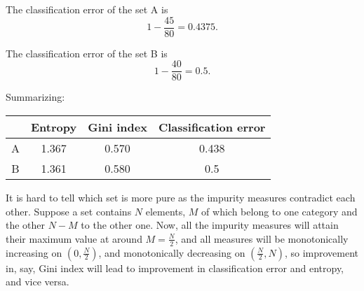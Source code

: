 \documentclass[10pt]{article}
\begin{document}
The classification error of the set A is
\[
1 - \frac{45}{80} = 0.4375.
\]

The classification error of the set B is
\[
1 - \frac{40}{80} = 0.5.
\]

Summarizing:
\begin{center}
\begin{tabular}{|c||c|c|c|}
\hline
  & Entropy & Gini index & Classification error \\
\hline
A & 1.367 & 0.570 & 0.438 \\
B & 1.361 & 0.580 & 0.5 \\
\hline
\end{tabular}
\end{center}
It is hard to tell which set is more pure as the impurity measures contradict each other. Suppose a set contains $N$ elements, $M$ of which belong to one category and the other $N - M$ to the other one. Now, all the impurity measures will attain their maximum value at around $M = \frac{N}{2}$, and all measures will be monotonically increasing on $(0, \frac{N}{2})$, and monotonically decreasing on $(\frac{N}{2}, N)$, so improvement in, say, Gini index will lead to improvement in classification error and entropy, and vice versa.
\end{document}
